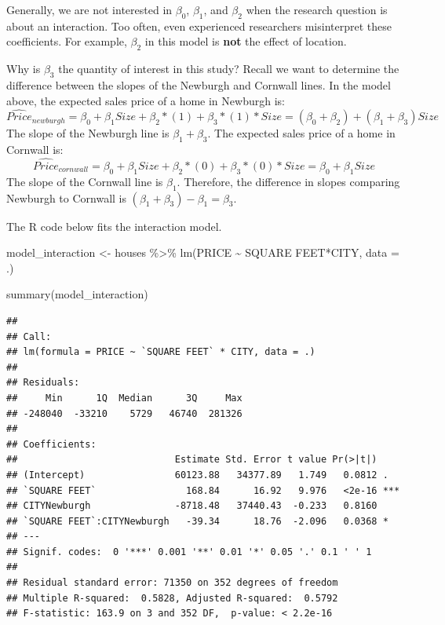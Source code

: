 \documentclass[
]{book}
\newenvironment{Shaded}{\begin{snugshade}}{\end{snugshade}}
\newcommand{\AttributeTok}[1]{\textcolor[rgb]{0.77,0.63,0.00}{#1}}
\newcommand{\FunctionTok}[1]{\textcolor[rgb]{0.00,0.00,0.00}{#1}}
\newcommand{\NormalTok}[1]{#1}
\newcommand{\OtherTok}[1]{\textcolor[rgb]{0.56,0.35,0.01}{#1}}
\newcommand{\SpecialCharTok}[1]{\textcolor[rgb]{0.00,0.00,0.00}{#1}}
\newcommand{\StringTok}[1]{\textcolor[rgb]{0.31,0.60,0.02}{#1}}
\begin{document}
Generally, we are not interested in \(\beta_0\), \(\beta_1\), and \(\beta_2\) when the research question is about an interaction. Too often, even experienced researchers misinterpret these coefficients. For example, \(\beta_2\) in this model is \textbf{not} the effect of location.

Why is \(\beta_3\) the quantity of interest in this study? Recall we want to determine the difference between the slopes of the Newburgh and Cornwall lines. In the model above, the expected sales price of a home in Newburgh is: \[\widehat{Price}_{newburgh} = \beta_0 + \beta_1 Size + \beta_2 * (1) + \beta_3 * (1) * Size = (\beta_0 + \beta_2) + (\beta_1 + \beta_3) Size\] The slope of the Newburgh line is \(\beta_1 + \beta_3\). The expected sales price of a home in Cornwall is: \[\widehat{Price}_{cornwall} = \beta_0 + \beta_1 Size + \beta_2 * (0) + \beta_3 * (0) * Size = \beta_0 + \beta_1 Size\] The slope of the Cornwall line is \(\beta_1\). Therefore, the difference in slopes comparing Newburgh to Cornwall is \((\beta_1 + \beta_3) - \beta_1 = \beta_3\).

The R code below fits the interaction model.

\begin{Shaded}
\begin{Highlighting}[]
\NormalTok{model\_interaction }\OtherTok{\textless{}{-}}\NormalTok{ houses }\SpecialCharTok{\%\textgreater{}\%} 
  \FunctionTok{lm}\NormalTok{(PRICE }\SpecialCharTok{\textasciitilde{}} \StringTok{\textasciigrave{}}\AttributeTok{SQUARE FEET}\StringTok{\textasciigrave{}}\SpecialCharTok{*}\NormalTok{CITY, }\AttributeTok{data =}\NormalTok{ .)}

\FunctionTok{summary}\NormalTok{(model\_interaction)}
\end{Highlighting}
\end{Shaded}

\begin{verbatim}
## 
## Call:
## lm(formula = PRICE ~ `SQUARE FEET` * CITY, data = .)
## 
## Residuals:
##     Min      1Q  Median      3Q     Max 
## -248040  -33210    5729   46740  281326 
## 
## Coefficients:
##                            Estimate Std. Error t value Pr(>|t|)    
## (Intercept)                60123.88   34377.89   1.749   0.0812 .  
## `SQUARE FEET`                168.84      16.92   9.976   <2e-16 ***
## CITYNewburgh               -8718.48   37440.43  -0.233   0.8160    
## `SQUARE FEET`:CITYNewburgh   -39.34      18.76  -2.096   0.0368 *  
## ---
## Signif. codes:  0 '***' 0.001 '**' 0.01 '*' 0.05 '.' 0.1 ' ' 1
## 
## Residual standard error: 71350 on 352 degrees of freedom
## Multiple R-squared:  0.5828, Adjusted R-squared:  0.5792 
## F-statistic: 163.9 on 3 and 352 DF,  p-value: < 2.2e-16
\end{verbatim}
\end{document}
